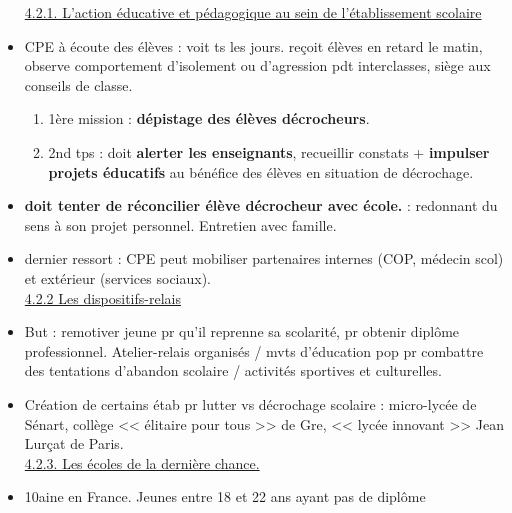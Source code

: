 \documentclass[12pt]{article}
\begin{document}
\begin{itemize}
\underline{4.2.1. L'action éducative et pédagogique au sein de l'établissement scolaire} \\

\item CPE à écoute des élèves : voit ts les jours.  reçoit élèves en retard le matin, observe comportement d'isolement ou d'agression pdt interclasses, siège aux conseils de classe. 
\begin{enumerate}
\item 1ère mission : \textbf{dépistage des élèves décrocheurs}. \\
\item 2nd tps : doit \textbf{alerter les enseignants}, recueillir constats + \textbf{impulser projets éducatifs} au bénéfice des élèves en situation de décrochage. \\
\end{enumerate}

\item \textbf{doit tenter de réconcilier élève décrocheur avec école.} : redonnant du sens à son projet personnel. Entretien avec famille. \\

\item  dernier ressort : CPE peut mobiliser partenaires internes (COP, médecin scol) et extérieur (services sociaux). \\

\underline{4.2.2 Les dispositifs-relais} \\

\item But : remotiver jeune pr qu'il reprenne sa scolarité, pr obtenir diplôme professionnel. Atelier-relais organisés / mvts d'éducation pop pr combattre des tentations d'abandon scolaire / activités sportives et culturelles. \\

\item Création de certains étab pr lutter vs décrochage scolaire : micro-lycée de Sénart, collège << élitaire pour tous >> de Gre, << lycée innovant >> Jean Lurçat de Paris. \\

\underline{4.2.3. Les écoles de la dernière chance.} \\

\item 10aine en France. Jeunes entre 18 et 22 ans ayant pas de diplôme




























\end{itemize}
\end{document}
